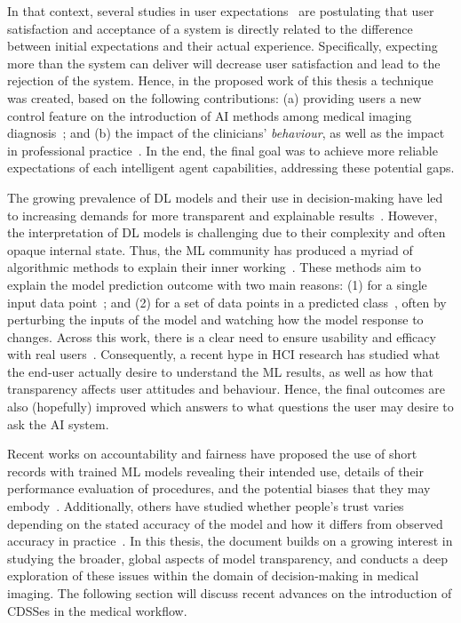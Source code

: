 In that context, several studies in user expectations~\cite{Kocielnik:2019:YAI:3290605.3300641, leung2019health} are postulating that user satisfaction and acceptance of a system is directly related to the difference between initial expectations and their actual experience.
Specifically, expecting more than the system can deliver will decrease user satisfaction and lead to the rejection of the system.
Hence, in the proposed work of this thesis a technique was created, based on the following contributions:
(a) providing users a new control feature on the introduction of \ac{AI} methods among medical imaging diagnosis~\cite{pesapane2018artificial}; and
(b) the impact of the clinicians' {\it behaviour}, as well as the impact in professional practice~\cite{Challen231}.
In the end, the final goal was to achieve more reliable expectations of each intelligent agent capabilities, addressing these potential gaps.

The growing prevalence of \ac{DL} models and their use in decision-making have led to increasing demands for more transparent and explainable results~\cite{10.5555/3305381.3305576}.
However, the interpretation of \ac{DL} models is challenging due to their complexity and often opaque internal state.
Thus, the \ac{ML} community has produced a myriad of algorithmic methods to explain their inner working~\cite{Shakerin_Gupta_2019, 10.1145/3329859.3329878}.
These methods aim to explain the model prediction outcome with two main reasons:
(1) for a single input data point~\cite{10.1145/2939672.2939778}; and
(2) for a set of data points in a predicted class~\cite{pmlr-v80-kim18d}, often by perturbing the inputs of the model and watching how the model response to changes.
Across this work, there is a clear need to ensure usability and efficacy with real users~\cite{10.1145/3173574.3174156}.
Consequently, a recent hype in \ac{HCI} research has studied what the end-user actually desire to understand the \ac{ML} results, as well as how that transparency affects user attitudes and behaviour.
Hence, the final outcomes are also (hopefully) improved which answers to what questions the user may desire to ask the \ac{AI} system.

Recent works on accountability and fairness have proposed the use of short records with trained \ac{ML} models revealing their intended use, details of their performance evaluation of procedures, and the potential biases that they may embody~\cite{10.1145/3351095.3375709, 10.1145/3287560.3287596}.
Additionally, others have studied whether people's trust varies depending on the stated accuracy of the model and how it differs from observed accuracy in practice~\cite{10.1145/3290605.3300509}.
In this thesis, the document builds on a growing interest in studying the broader, global aspects of model transparency, and conducts a deep exploration of these issues within the domain of decision-making in medical imaging.
The following section will discuss recent advances on the introduction of \acp{CDSSe} in the medical workflow.


